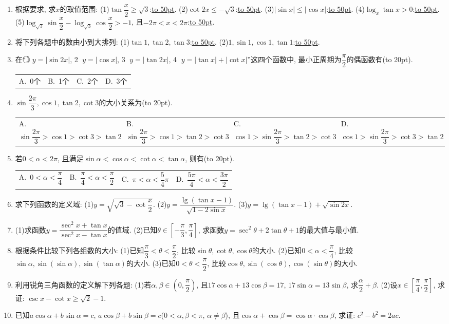 \documentclass[10pt,a4paper]{article}
\newcommand{\blank}[1]{\underline{\hbox to #1pt{}}}
\newcommand{\bracket}[1]{(\hbox to #1pt{})}
\newcommand{\fourch}[4]{\par\begin{tabular}{p{.23\textwidth}p{.23\textwidth}p{.23\textwidth}p{.23\textwidth}}
A.~#1 &B.~#2& C.~#3& D.~#4
\end{tabular}}
\begin{document}
\begin{enumerate}[1.]
\item 根据要求, 求$x$的取值范围:
(1)$\tan \dfrac x2\ge \sqrt 3$:\blank{50}.
(2)$\cot 2x\le -\sqrt 3$:\blank{50}.
(3)$|\sin x|\le|\cos x|$:\blank{50}.
(4)$\log _x\tan x>0$:\blank{50}.
(5)$\log _{\sqrt 3}\sin \dfrac x2-\log _{\sqrt 3}\cos \dfrac x2>-1$, 且$-2\pi <x<2\pi$:\blank{50}.
\item 将下列各题中的数由小到大排列:
(1)$\tan 1,\tan 2,\tan 3$:\blank{50}.
(2)$1,\sin 1,\cos 1,\tan 1$:\blank{50}.
\item 在``\textcircled{1} $y=|\sin 2x|$, \textcircled{2} $y=|\cos x|$, \textcircled{3} $y=|\tan 2x|$, \textcircled{4} $y=|\tan x|+|\cot x|$''这四个函数中, 最小正周期为$\dfrac{\pi }2$的偶函数有\bracket{20}.
\fourch{0个}{1个}{2个}{3个}
\item $\sin \dfrac{2\pi }3,\cos 1,\tan 2,\cot 3$的大小关系为\bracket{20}.
\fourch{$\sin \dfrac{2\pi }3>\cos 1>\cot 3>\tan 2$}{$\sin \dfrac{2\pi }3>\cos 1>\tan 2>\cot 3$}{$\cos 1>\sin \dfrac{2\pi }3>\tan 2>\cot 3$}{$\cos 1>\sin \dfrac{2\pi }3>\cot 3>\tan 2$}
\item 若$0<\alpha <2\pi$, 且满足$\sin \alpha <\cos \alpha <\cot \alpha <\tan \alpha$, 则有\bracket{20}.
\fourch{$0<\alpha <\dfrac{\pi }4$}{$\dfrac{\pi }4<\alpha <\dfrac{\pi }2$}{$\pi <\alpha <\dfrac 54\pi$}{$\dfrac{5\pi }4<\alpha <\dfrac{3\pi }2$}
\item 求下列函数的定义域:
(1)$y=\sqrt {\sqrt 3-\cot \dfrac x2}$.
(2)$y=\dfrac{\lg (\tan x-1)}{\sqrt {1-2\sin x}}$.
(3)$y=\lg (\tan x-1)+\sqrt {\sin 2x}$.
\item (1)求函数$y=\dfrac{\sec ^2x+\tan x}{\sec ^2x-\tan x}$的值域.
(2)已知$\theta \in [-\dfrac{\pi }3,\dfrac{\pi }4]$, 求函数$y=\sec ^2\theta +2\tan \theta +1$的最大值与最小值.
\item 根据条件比较下列各组数的大小:
(1)已知$\dfrac{\pi }3<\theta <\dfrac{\pi }2$, 比较$\sin \theta ,\cot \theta ,\cos \theta$的大小.
(2)已知$0<\alpha <\dfrac{\pi }4$, 比较$\sin \alpha ,\sin (\sin \alpha),\sin (\tan \alpha)$的大小.
(3)已知$0<\theta <\dfrac{\pi }2$, 比较$\cos \theta ,\sin (\cos \theta),\cos (\sin \theta)$的大小.
\item 利用锐角三角函数的定义解下列各题:
(1)若$\alpha ,\beta \in (0,\dfrac{\pi }2)$, 且$17\cos \alpha +13\cos \beta =17$, $17\sin \alpha =13\sin \beta$, 求$\dfrac{\alpha }2+\beta$.
(2)设$x\in [\dfrac{\pi }4,\dfrac{\pi }2]$, 求证: $\csc x-\cot x\ge \sqrt 2-1$.
\item 已知$a\cos \alpha +b\sin \alpha =c$, $a\cos \beta +b\sin \beta =c$($0<\alpha ,\beta <\pi$, $\alpha \ne \beta$), 且$\cos \alpha +\cos \beta =\cos \alpha \cdot \cos \beta$, 求证: $c^2-b^2=2ac$.

\end{enumerate}
\end{document}
